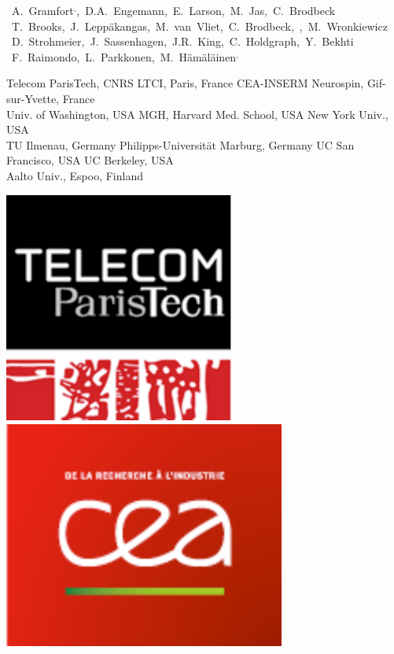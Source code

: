 \documentclass[t,11pt,compress]{beamer} %
\def\name#1{\mbox{\sc #1}}
\begin{document}
\begin{frame}[plain,t,c]
{    \begin{center}
    \mbox{\hspace{-1em}%
    \name{A. Gramfort\PARISTECH$^{,}$\NSPIN, D.A. Engemann\NSPIN, E. Larson\UW, M. Jas\PARISTECH, C. Brodbeck\NYU}}
    \mbox{\hspace{-1em}%
    \name{T. Brooks\NYU, J. Lepp\"akangas\PARISTECH, M. van Vliet\LEUVEN, C. Brodbeck\NYU, , M. Wronkiewicz\UW}}
    \mbox{\hspace{-1em}
    \name{D. Strohmeier\ILMENAU, J. Sassenhagen\MARBURG, J.R. King\NYU, C. Holdgraph\UCB, Y. Bekhti\PARISTECH}}
    \mbox{\hspace{-1em}
          \name{F. Raimondo\NSPIN, L. Parkkonen\AALTO, M. H\"am\"al\"ainen\MGH$^,$\AALTO}}
	\vspace{0.05cm}
	\def\affilbr{\hspace{0.2cm}}
    \parbox{13cm}{\tiny\center
                 \PARISTECH Telecom ParisTech, CNRS LTCI, Paris, France \affilbr
                 \NSPIN CEA-INSERM Neurospin, Gif-sur-Yvette, France \affilbr\\
                 \UW Univ. of Washington, USA \affilbr
                 \MGH MGH, Harvard Med. School, USA \affilbr
                 \NYU New York Univ., USA \affilbr\\
                 \ILMENAU TU Ilmenau, Germany \affilbr
                 \MARBURG Philipps-Universität Marburg, Germany \affilbr
                 \UCSF UC San Francisco, USA \affilbr
                 \UCB UC Berkeley, USA \affilbr\\
                \AALTO Aalto Univ., Espoo, Finland \affilbr
                 }
    \end{center}
}
%
\hfill
%
\begin{minipage}{0.15\linewidth}
    \vspace{0ex}
    \hfill
    \centerline{%
    \includegraphics[width=0.188\linewidth]{logo_telecom}
    \,
    \includegraphics[width=0.233\linewidth]{logo_cea}
}
\end{minipage}
\end{frame}
\end{document}
